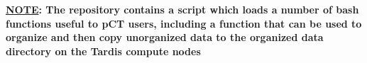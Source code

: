 \begin{tcbenvironment}
\begin{tcbparagraph}
\textbf{\ul{NOTE}: The  repository contains a script which loads a number of bash functions useful to pCT users, including a function that can be used to organize and then copy unorganized data to the organized data directory on the Tardis compute nodes}
\end{tcbparagraph}
\end{tcbenvironment}
\endinput 